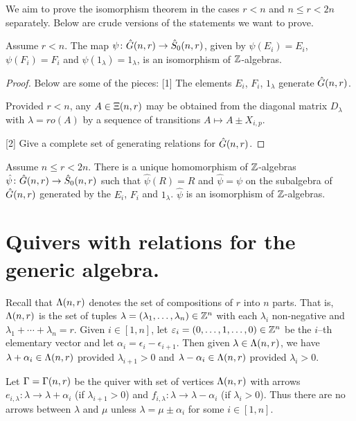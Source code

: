 \documentclass[a4paper, 11pt]{report}
\begin{document}
We aim to prove the isomorphism theorem in the cases $r<n$ and $n\le r< 2n$ separately. Below are crude versions of the statements we want to prove.

\begin{theorem}
Assume $r<n$. The map $\psi\colon\hat{G}(n,r)\to\hat{S}_0(n,r)$, given by $\psi(E_i)=E_i$, $\psi(F_i
)=F_i$ and $\psi(1_\lambda) = 1_\lambda$, is an isomorphism of $\mathbb{Z}$-algebras.
\end{theorem}
\begin{proof}{\color{gray}
Below are some of the pieces:
[1] The elements $E_i$, $F_i$, $1_\lambda$ generate $\hat{G}(n,r)$.

Provided $r<n$, any $A\in\Xi(n,r)$ may be obtained from the diagonal matrix $D_\lambda$ with $\lambda=ro(A)$ by a sequence of transitions $A \mapsto A\pm X_{i,p}$.

[2] Give a complete set of generating relations for $\hat{G}(n,r)$.}
\end{proof}

\begin{theorem}
Assume $n\le r< 2n$. There is a unique homomorphism of $\mathbb{Z}$-algebras $\hat{\psi}\colon\hat{G}(n,r)\to\hat{S}_0(n,r)$ such that $\hat{\psi}(R)=R$ and $\hat{\psi}=\psi$ on the subalgebra of $\hat{G}(n,r)$ generated by the $E_i$, $F_i$ and $1_\lambda$. $\hat{\psi}$ is an isomorphism of $\mathbb{Z}$-algebras.
\end{theorem}

\section{Quivers with relations for the generic algebra.}

Recall that $\Lambda(n,r)$ denotes the set of compositions of $r$ into $n$ parts. That is, $\Lambda(n,r)$ is the set of tuples $\lambda = (\lambda_1,\ldots,\lambda_n)\in\mathbb{Z}^n$ with each $\lambda_i$ non-negative and $\lambda_1 +\cdots +\lambda_n = r$. Given $i\in [1,n]$, let $\varepsilon_i = (0,\ldots,1,\ldots,0)\in\mathbb{Z}^n$ be the $i$--th elementary vector and let $\alpha_i = \epsilon_i - \epsilon_{i+1}$. Then given $\lambda\in\Lambda(n,r)$, we have $\lambda + \alpha_i\in\Lambda(n,r)$ provided $\lambda_{i+1}>0$ and $\lambda - \alpha_i\in\Lambda(n,r)$ provided $\lambda_i>0$.

Let $\Gamma =\Gamma(n,r)$ be the quiver with set of vertices $\Lambda(n,r)$ with arrows $e_{i,\lambda}\colon\lambda\to\lambda +\alpha_i$ (if $\lambda_{i+1}>0$) and $f_{i,\lambda}\colon\lambda\to\lambda -\alpha_i$ (if $\lambda_i>0$). Thus there are no arrows between $\lambda$ and $\mu$ unless $\lambda = \mu\pm \alpha_i$ for some $i\in [1,n]$.
\end{document}
